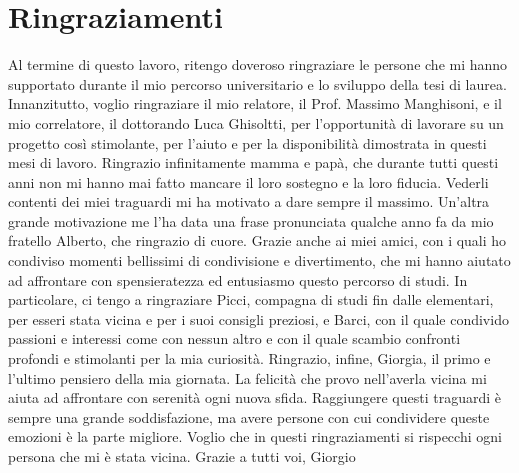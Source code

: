 \newpage
\mbox{}
\chapter*{Ringraziamenti}
Al termine di questo lavoro, ritengo doveroso ringraziare le persone che mi hanno supportato durante il mio percorso universitario e lo 
sviluppo della tesi di laurea.
\newline \newline Innanzitutto, voglio ringraziare il mio relatore, il Prof. Massimo Manghisoni, e il mio correlatore, il dottorando Luca Ghisoltti, per 
l'opportunità di lavorare su un progetto così stimolante, per l'aiuto e per la disponibilità dimostrata in questi mesi di lavoro.
\newline \newline Ringrazio infinitamente mamma e papà, che durante tutti questi anni non mi hanno mai fatto mancare il loro sostegno e la loro fiducia. 
Vederli contenti dei miei traguardi mi ha motivato a dare sempre il massimo. Un'altra grande motivazione me l'ha data una frase pronunciata 
qualche anno fa da mio fratello Alberto, che ringrazio di cuore.
\newline \newline Grazie anche ai miei amici, con i quali ho condiviso momenti bellissimi di condivisione e divertimento, che mi hanno aiutato ad affrontare 
con spensieratezza ed entusiasmo questo percorso di studi. In particolare, ci tengo a ringraziare Picci, compagna di studi fin dalle 
elementari, per esseri stata vicina e per i suoi consigli preziosi, e Barci, con il quale condivido passioni e interessi come con 
nessun altro e con il quale scambio confronti profondi e stimolanti per la mia curiosità.
\newline \newline Ringrazio, infine, Giorgia, il primo e l'ultimo pensiero della mia giornata. La felicità che provo nell'averla vicina mi aiuta ad affrontare 
con serenità ogni nuova sfida.
\newline \newline Raggiungere questi traguardi è sempre una grande soddisfazione, ma avere persone con cui condividere queste emozioni è la parte 
migliore. Voglio che in questi ringraziamenti si rispecchi ogni persona che mi è stata vicina.
\newline \newline Grazie a tutti voi,
\newline Giorgio
